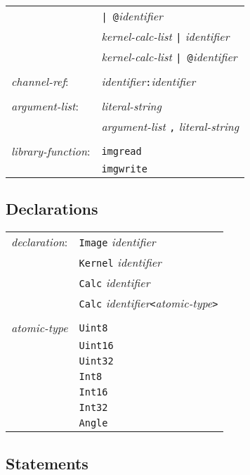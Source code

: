 \begin{center}
\begin{tabular}{l l}
& \texttt{| @}\emph{identifier}\\
& \emph{kernel-calc-list} \texttt{|} \emph{identifier}\\
& \emph{kernel-calc-list} \texttt{| @}\emph{identifier}\\
\\
\emph{channel-ref}: & \emph{identifier}\texttt{:}\emph{identifier}\\
\\
\emph{argument-list}: & \emph{literal-string}\\
& \emph{argument-list} \texttt{,} \emph{literal-string}\\
\\
\emph{library-function}: & \texttt{imgread}\\
& \texttt{imgwrite}\\
\end{tabular}\end{center}

\subsection{Declarations}

\begin{center}\begin{tabular}{l l}
\emph{declaration}: & \texttt{Image} \emph{identifier}\\
& \texttt{Kernel} \emph{identifier}\\
& \texttt{Calc} \emph{identifier}\\
& \texttt{Calc} \emph{identifier}\texttt{<}\emph{atomic-type}\texttt{>}\\
\\
\emph{atomic-type} & \texttt{Uint8}\\
& \texttt{Uint16}\\
& \texttt{Uint32}\\
& \texttt{Int8}\\
& \texttt{Int16}\\
& \texttt{Int32}\\
& \texttt{Angle}\\
\end{tabular}\end{center}


\subsection{Statements}

